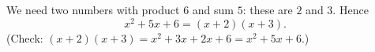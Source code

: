 We need two numbers with product $6$ and sum $5$: these are $2$ and $3$. Hence
\[
x^2+5x+6=\boxed{(x+2)(x+3)}.
\]
(Check: $(x+2)(x+3)=x^2+3x+2x+6=x^2+5x+6$.)

